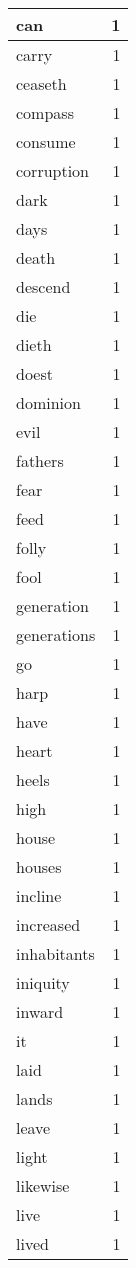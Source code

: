 \begin{center}
\begin{longtable}{l|r}
can & 1 \\ \hline
carry & 1 \\ \hline
ceaseth & 1 \\ \hline
compass & 1 \\ \hline
consume & 1 \\ \hline
corruption & 1 \\ \hline
dark & 1 \\ \hline
days & 1 \\ \hline
death & 1 \\ \hline
descend & 1 \\ \hline
die & 1 \\ \hline
dieth & 1 \\ \hline
doest & 1 \\ \hline
dominion & 1 \\ \hline
evil & 1 \\ \hline
fathers & 1 \\ \hline
fear & 1 \\ \hline
feed & 1 \\ \hline
folly & 1 \\ \hline
fool & 1 \\ \hline
generation & 1 \\ \hline
generations & 1 \\ \hline
go & 1 \\ \hline
harp & 1 \\ \hline
have & 1 \\ \hline
heart & 1 \\ \hline
heels & 1 \\ \hline
high & 1 \\ \hline
house & 1 \\ \hline
houses & 1 \\ \hline
incline & 1 \\ \hline
increased & 1 \\ \hline
inhabitants & 1 \\ \hline
iniquity & 1 \\ \hline
inward & 1 \\ \hline
it & 1 \\ \hline
laid & 1 \\ \hline
lands & 1 \\ \hline
leave & 1 \\ \hline
light & 1 \\ \hline
likewise & 1 \\ \hline
live & 1 \\ \hline
lived & 1 \\ \hline

\end{longtable}
\end{center}

